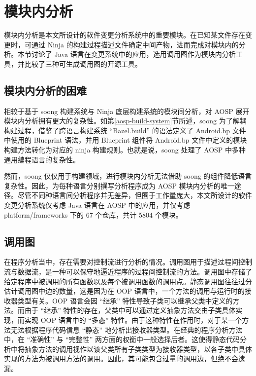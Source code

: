 \section{模块内分析}\label{intramodule-analysis}

模块内分析是本文所设计的软件变更分析系统中的重要模块。在已知某文件存在变更时，可通过 Ninja 的构建过程描述文件确定中间产物，进而完成对模块内的分析。本节讨论了 Java 语言在变更系统中的应用，选用调用图作为模块内分析工具，并比较了三种可生成调用图的开源工具。

\subsection{模块内分析的困难}

相较于基于 soong 构建系统与 Ninja 底层构建系统的模块间分析，对 AOSP 展开模块内分析拥有更大的复杂性。如第\ref{aosp-build-system}节所述，soong 为了解耦构建过程，借鉴了跨语言构建系统 “Bazel.build” 的语法定义了 Android.bp 文件中使用的 Blueprint 语法，并用 Blueprint 组件将 Android.bp 文件中定义的模块构建方法转化为对应的 ninja 构建规则。也就是说，soong 处理了 AOSP 中多种通用编程语言的复杂性。

然而，soong 仅仅用于构建领域，进行模块内分析无法借助 soong 的组件降低语言复杂性。因此，为每种语言分别撰写分析程序成为 AOSP 模块内分析的唯一途径。尽管不同种语言间分析程序并无差异，但囿于工作量庞大，本文所设计的软件变更分析系统仅考虑 Java 语言在 AOSP 中的应用，并仅考虑 platform/frameworks 下的 67 个仓库，共计 5804 个模块。

\subsection{调用图}

在程序分析当中，存在需要对控制流进行分析的情况。调用图用于描述过程间控制流与数据流，是一种可以保守地逼近程序的过程间控制流的方法。调用图中存储了给定程序中被调用的所有函数以及每个被调用函数的调用点\cite{MoellerS20}。静态调用图往往过分估计调用图中边的数量，这是因为在 OOP 语言中，一个方法的调用与运行时的接收器类型有关\cite{JSP19}。OOP 语言会因 “继承” 特性导致子类可以继承父类中定义的方法。而由于 “继承” 特性的存在，父类中可以通过定义抽象方法交由子类具体实现，而实现 OOP 语言中的 “多态” 特性。由于这种特性在作用时，对于某一个方法无法根据程序代码信息 “静态” 地分析出接收器类型。在经典的程序分析方法中，在 “准确性” 与 “完整性” 两方面的权衡中一般选择后者。这使得静态代码分析中将抽象方法的调用视作以该父类所有子类类型为接收器类型，以各子类中具体实现的方法为被调用方法的调用。因此，其可能包含过量的调用边，但绝不会遗漏。

